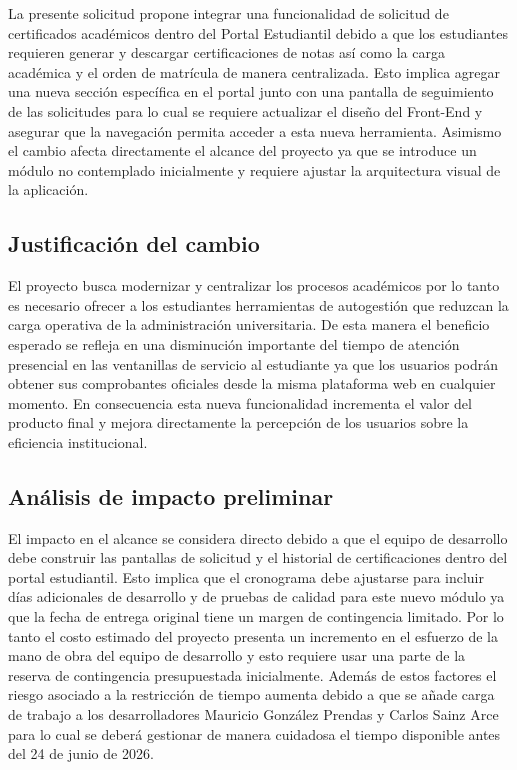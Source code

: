 \documentclass[11pt,spanish]{article}
\begin{document}
La presente solicitud propone integrar una funcionalidad de solicitud de certificados académicos dentro del Portal Estudiantil debido a que los estudiantes requieren generar y descargar certificaciones de notas así como la carga académica y el orden de matrícula de manera centralizada. Esto implica agregar una nueva sección específica en el portal junto con una pantalla de seguimiento de las solicitudes para lo cual se requiere actualizar el diseño del Front-End y asegurar que la navegación permita acceder a esta nueva herramienta. Asimismo el cambio afecta directamente el alcance del proyecto ya que se introduce un módulo no contemplado inicialmente y requiere ajustar la arquitectura visual de la aplicación.

\subsection{Justificación del cambio}

El proyecto busca modernizar y centralizar los procesos académicos por lo tanto es necesario ofrecer a los estudiantes herramientas de autogestión que reduzcan la carga operativa de la administración universitaria. De esta manera el beneficio esperado se refleja en una disminución importante del tiempo de atención presencial en las ventanillas de servicio al estudiante ya que los usuarios podrán obtener sus comprobantes oficiales desde la misma plataforma web en cualquier momento. En consecuencia esta nueva funcionalidad incrementa el valor del producto final y mejora directamente la percepción de los usuarios sobre la eficiencia institucional.

\subsection{Análisis de impacto preliminar}

El impacto en el alcance se considera directo debido a que el equipo de desarrollo debe construir las pantallas de solicitud y el historial de certificaciones dentro del portal estudiantil. Esto implica que el cronograma debe ajustarse para incluir días adicionales de desarrollo y de pruebas de calidad para este nuevo módulo ya que la fecha de entrega original tiene un margen de contingencia limitado. Por lo tanto el costo estimado del proyecto presenta un incremento en el esfuerzo de la mano de obra del equipo de desarrollo y esto requiere usar una parte de la reserva de contingencia presupuestada inicialmente. Además de estos factores el riesgo asociado a la restricción de tiempo aumenta debido a que se añade carga de trabajo a los desarrolladores Mauricio González Prendas y Carlos Sainz Arce para lo cual se deberá gestionar de manera cuidadosa el tiempo disponible antes del 24 de junio de 2026.
\end{document}
